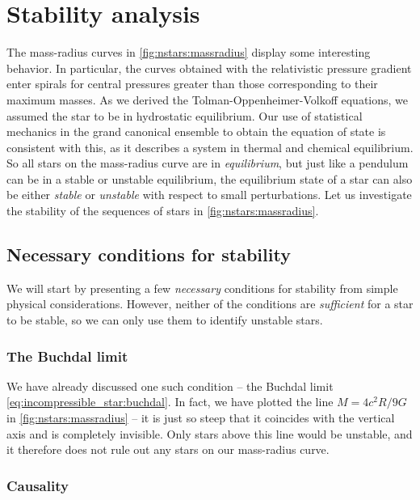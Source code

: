 \section{Stability analysis}

The mass-radius curves in \cref{fig:nstars:massradius} display some interesting behavior.
In particular, the curves obtained with the relativistic pressure gradient enter spirals for central pressures greater than those corresponding to their maximum masses.
As we derived the Tolman-Oppenheimer-Volkoff equations, we assumed the star to be in hydrostatic equilibrium.
Our use of statistical mechanics in the grand canonical ensemble to obtain the equation of state is consistent with this, as it describes a system in thermal and chemical equilibrium.
So all stars on the mass-radius curve are in \emph{equilibrium}, but just like a pendulum can be in a stable or unstable equilibrium, the equilibrium state of a star can also be either \emph{stable} or \emph{unstable} with respect to small perturbations.
Let us investigate the stability of the sequences of stars in \cref{fig:nstars:massradius}.

\subsection{Necessary conditions for stability}
\label{sec:nstars:stability_necessary}

We will start by presenting a few \emph{necessary} conditions for stability from simple physical considerations.
However, neither of the conditions are \emph{sufficient} for a star to be stable, so we can only use them to identify unstable stars.

\subsubsection{The Buchdal limit}

We have already discussed one such condition -- the Buchdal limit \eqref{eq:incompressible_star:buchdal}.
In fact, we have plotted the line $M = 4 c^2 R / 9 G$ in \cref{fig:nstars:massradius} -- it is just so steep that it coincides with the vertical axis and is completely invisible.
Only stars above this line would be unstable, and it therefore does not rule out any stars on our mass-radius curve.

\subsubsection{Causality}

